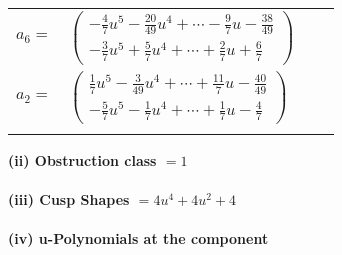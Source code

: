 \documentclass[1p]{elsarticle_modified}
\theoremstyle{definition}
\begin{document}
\begin{tabular}{m{7pt} m{180pt} m{7pt} m{180pt} }
\flushright $a_{6}=$&$\begin{pmatrix}-\frac{4}{7} u^5-\frac{20}{49} u^4+\cdots-\frac{9}{7} u-\frac{38}{49}\\-\frac{3}{7} u^5+\frac{5}{7} u^4+\cdots+\frac{2}{7} u+\frac{6}{7}\end{pmatrix}$ \\
\flushright $a_{2}=$&$\begin{pmatrix}\frac{1}{7} u^5-\frac{3}{49} u^4+\cdots+\frac{11}{7} u-\frac{40}{49}\\-\frac{5}{7} u^5-\frac{1}{7} u^4+\cdots+\frac{1}{7} u-\frac{4}{7}\end{pmatrix}$\\&\end{tabular}
\flushleft \textbf{(ii) Obstruction class $= 1$}\\~\\
\flushleft \textbf{(iii) Cusp Shapes $= 4 u^4+4 u^2+4$}\\~\\
\newpage\renewcommand{\arraystretch}{1}
\flushleft \textbf{(iv) u-Polynomials at the component}\newline \\
\end{document}
